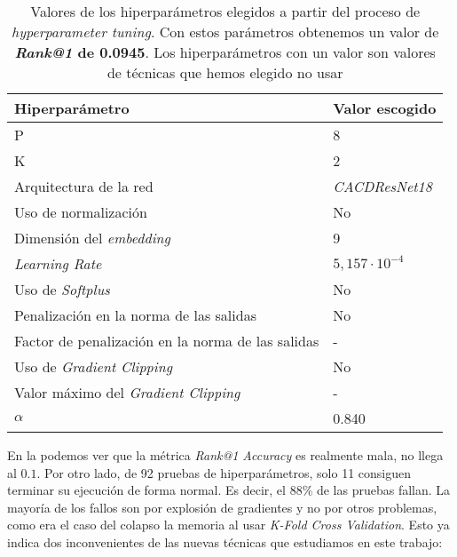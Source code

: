 \begin{table}[!hbt]
\centering
\begin{tabular}{|l|l|}
    \hline
    \textbf{Hiperparámetro}                           & \textbf{Valor escogido} \\
    \hline
    P                                                 & 8                       \\
    K                                                 & 2                       \\
    Arquitectura de la red                            & \textit{CACDResNet18}   \\
    Uso de normalización                              & No                      \\
    Dimensión del \textit{embedding}                  & 9                       \\
    \textit{Learning Rate}                            & $5,157 \cdot 10^{-4}$   \\
    Uso de \textit{Softplus}                          & No                      \\
    Penalización en la norma de las salidas           & No                      \\
    Factor de penalización en la norma de las salidas & -                       \\
    Uso de \textit{Gradient Clipping}                 & No                      \\
    Valor máximo del \textit{Gradient Clipping}       & -                       \\
    $\alpha$                                          & 0.840                   \\

    \hline
\end{tabular}
\caption{Valores de los hiperparámetros elegidos a partir del proceso de \textit{hyperparameter tuning}. Con estos parámetros obtenemos un valor de \textbf{\textit{Rank@1} de 0.0945}. Los hiperparámetros con un valor \entrecomillado{-} son valores de técnicas que hemos elegido no usar}
\label{table:hp_escogidos}
\end{table}

En la  podemos ver que la métrica \textit{Rank@1 Accuracy} es realmente mala, no llega al $0.1$. Por otro lado, de 92 pruebas de hiperparámetros, solo 11 consiguen terminar su ejecución de forma normal. Es decir, el 88\% de las pruebas fallan. La mayoría de los fallos son por explosión de gradientes y no por otros problemas, como era el caso del colapso la memoria al usar \textit{K-Fold Cross Validation}. Esto ya indica dos inconvenientes de las nuevas técnicas que estudiamos en este trabajo:

